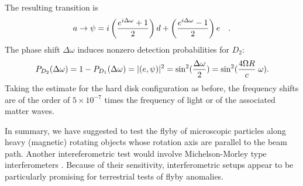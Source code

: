 \documentclass[prl,preprint,amsfonts,showpacs,showkeys]{revtex4}
\begin{document}
The resulting transition is
\begin{equation}
  a  \rightarrow \psi =i\left( {e^{i\Delta \omega} +1\over
2}\right)
d  +
\left( {e^{i\Delta \omega} -1\over 2}\right)
e  \quad .
\label{e:mz}
\end{equation}
The phase shift $\Delta \omega$ induces nonzero detection probabilities for $D_2$:
\begin{equation}
P_{D_2}(\Delta \omega )= 1-P_{D_1}(\Delta \omega )=\vert ( e, \psi ) \vert^2=\sin^2({\Delta \omega \over 2})=\sin^2({{4\Omega R\over c}\;\omega }).
\end{equation}
Taking the estimate for the hard disk configuration as before, the frequency shifts are of the order of $5 \times 10^{-7}$ times the frequency of light or of the associated matter waves.


In summary, we have suggested to test the flyby of microscopic particles along heavy (magnetic) rotating objects whose rotation axis are parallel to the beam path.
Another intereferometric test would involve Michelson-Morley type interferometers \cite{cahill-2008}.
Because of their sensitivity,  interferometric setups appear to be particularly promising for terrestrial tests of flyby anomalies.

%
%
%
%
%
\end{document}
